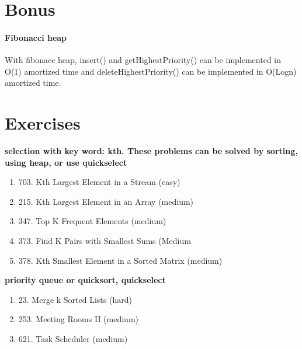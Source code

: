 \documentclass[../main.tex]{subfiles}
\begin{document}
\section{Bonus}
\label{heap_sec_bonus}
\paragraph{Fibonacci heap} With fibonacc heap, insert() and getHighestPriority() can be implemented in O(1) amortized time and deleteHighestPriority() can be implemented in O(Logn) amortized time.
\section{Exercises}

\textbf{selection with key word: kth. These problems can be solved by sorting, using heap, or use quickselect}
\begin{enumerate}
\item 703. Kth Largest Element in a Stream (easy)
    \item 215. Kth Largest Element in an Array (medium)
    \item 	347. Top K Frequent Elements (medium)
    \item 373. Find K Pairs with Smallest Sums (Medium	
	\item 378. Kth Smallest Element in a Sorted Matrix (medium)
\end{enumerate}
\textbf{priority queue or quicksort, quickselect}
\begin{enumerate}
    \item 23. Merge k Sorted Lists (hard)
    \item 253. Meeting Rooms II (medium)
    \item 621. Task Scheduler (medium)
\end{enumerate}
\end{document}
